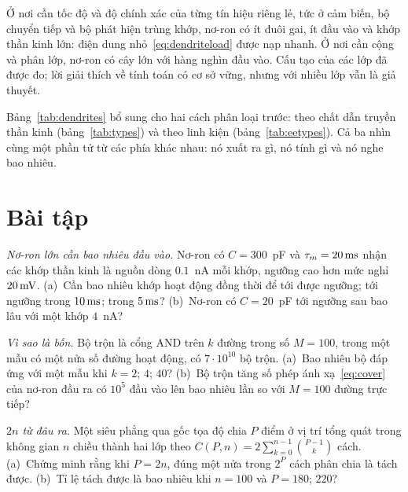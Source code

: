\begin{keyblock}
\begin{proposition}
\label{prop:dendrites}
Ở nơi cần tốc độ và độ chính xác của từng tín hiệu riêng lẻ, tức ở cảm biến, bộ chuyển tiếp và bộ phát hiện trùng khớp, nơ-ron có ít đuôi gai, ít đầu vào và khớp thần kinh lớn: điện dung nhỏ~\eqref{eq:dendriteload} được nạp nhanh. Ở nơi cần cộng và phân lớp, nơ-ron có cây lớn với hàng nghìn đầu vào. Cấu tạo của các lớp đã được đo; lời giải thích về tính toán có cơ sở vững, nhưng với nhiều lớp vẫn là giả thuyết.
\end{proposition}
\end{keyblock}

Bảng~\ref{tab:dendrites} bổ sung cho hai cách phân loại trước: theo chất dẫn truyền thần kinh (bảng~\ref{tab:types}) và theo linh kiện (bảng~\ref{tab:eetypes}). Cả ba nhìn cùng một phần tử từ các phía khác nhau: nó xuất ra gì, nó tính gì và nó nghe bao nhiêu.

\section{Bài tập}

\begin{exercise}[\lvlA]
\label{ex:19:1}
\emph{Nơ-ron lớn cần bao nhiêu đầu vào.} Nơ-ron có $C=300$~pF và $\tau_m=20\,\text{ms}$ nhận các khớp thần kinh là nguồn dòng $0.1$~nA mỗi khớp, ngưỡng cao hơn mức nghỉ $20\,\text{mV}$. (a)~Cần bao nhiêu khớp hoạt động đồng thời để tới được ngưỡng; tới ngưỡng trong $10\,\text{ms}$; trong $5\,\text{ms}$? (b)~Nơ-ron có $C=20$~pF tới ngưỡng sau bao lâu với một khớp $4$~nA?
\end{exercise}

\begin{exercise}[\lvlA]
\label{ex:19:2}
\emph{Vì sao là bốn.} Bộ trộn là cổng AND trên $k$ đường trong số $M=100$, trong một mẫu có một nửa số đường hoạt động, có $7\cdot10^{10}$ bộ trộn. (a)~Bao nhiêu bộ đáp ứng với một mẫu khi $k=2$; $4$; $40$? (b)~Bộ trộn tăng số phép ánh xạ~\eqref{eq:cover} của nơ-ron đầu ra có $10^5$ đầu vào lên bao nhiêu lần so với $M=100$ đường trực tiếp?
\end{exercise}

\begin{exercise}[\lvlB]
\label{ex:19:3}
\emph{$2n$ từ đâu ra.} Một siêu phẳng qua gốc tọa độ chia $P$ điểm ở vị trí tổng quát trong không gian $n$ chiều thành hai lớp theo $C(P,n)=2\sum_{k=0}^{n-1}\binom{P-1}{k}$ cách. (a)~Chứng minh rằng khi $P=2n$, đúng một nửa trong $2^P$ cách phân chia là tách được. (b)~Tỉ lệ tách được là bao nhiêu khi $n=100$ và $P=180$; $220$?
\end{exercise}

